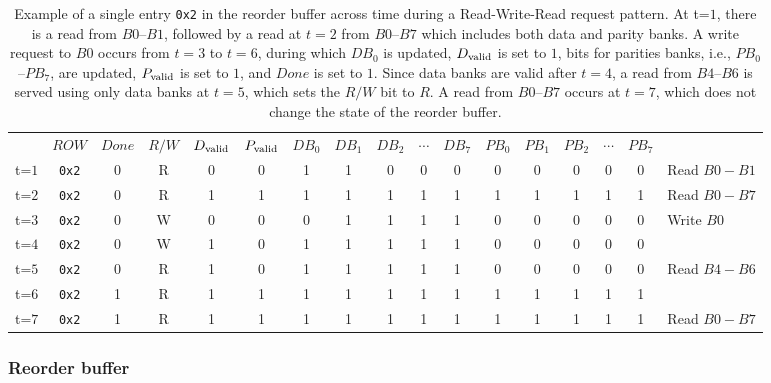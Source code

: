 \begin{table}[t!]
 \small
  \centering
  \begin{tabular}{c|c|c|c|c|c|c|c|c|c|c|c|c|c|c|c|l}
    \cline{2-16}
&    $ROW$ & $Done$ & $R/W$ & $D_{\rm valid}$ & $P_{\rm valid}$ & $DB_{0}$ &  $DB_{1}$ & $DB_{2}$ &$\cdots$ & $DB_7$  & $PB_0$ &  $PB_{1}$ & $PB_{2}$ & $\cdots$ & $PB_7$ \\
    \cline{2-16}
t=$1$ &   \texttt{0x2} & 0 & R  & 0 & 0  & 1 & 1 & 0 & 0 & 0 & 0 & 0  & 0 & 0& 0 & {\scriptsize Read $B0 - B1$}\\
    \cline{2-16}
t=$2$ &    \texttt{0x2} & 0 & R & 1 & 1 & 1 & 1 & 1 & 1& 1 & 1& 1 &1 &1&1& {\scriptsize Read $B0 - B7$}\\
   \cline{2-16}                          
t=$3$ &    \texttt{0x2} & 0 & W & 0 & 0 & 0 & 1 & 1 & 1& 1 & 0 & 0 & 0 & 0 & 0 & {\scriptsize Write $B0$} \\
   \cline{2-16}                          
t=$4$ &    \texttt{0x2} & 0 & W & 1 & 0 & 1 & 1 & 1 & 1& 1 & 0 & 0 & 0 & 0 & 0& \\
    \cline{2-16}   
t=$5$ &    \texttt{0x2} & 0 & R & 1 & 0 & 1 & 1 & 1 & 1& 1 & 0 & 0 & 0 & 0 & 0 & {\scriptsize Read $B4 - B6$}\\
    \cline{2-16} 
t=$6$ &    \texttt{0x2} & 1 & R & 1 & 1 & 1 & 1 & 1 & 1& 1 & 1 & 1 & 1 & 1 & 1 &\\
    \cline{2-16} 
t=$7$ &    \texttt{0x2} & 1 & R & 1 & 1 & 1 & 1 & 1 & 1& 1 & 1 & 1 & 1 & 1 & 1 &{\scriptsize Read $B0 - B7$} \\
    \cline{2-16}                                                     
  \end{tabular}
  \caption{Example of a single entry \texttt{0x2} in the reorder buffer across time during a Read-Write-Read request pattern. At t=$1$, there is a read from $B0$--$B1$, followed by a read at $t=2$ from $B0$--$B7$ which includes both data and parity banks. A write request to $B0$ occurs from $t=3$ to $t=6$, during which $DB_0$ is updated, $D_{\rm valid}$ is set to $1$, bits for parities banks, i.e., $PB_0$--$PB_7$, are updated, $P_{\rm valid}$ is set to $1$, and $Done$ is set to $1$. Since data banks are valid after $t=4$, a read from $B{4} $--$B6$ is served using only data banks at $t=5$, which sets the $R/W$ bit to $R$. A read from $B0 $--$B7$ occurs at $t=7$, which does not change the state of the reorder buffer.}
  \label{fig:rob}
\end{table}

\subsubsection{Reorder buffer}
\label{sec:reorder}

